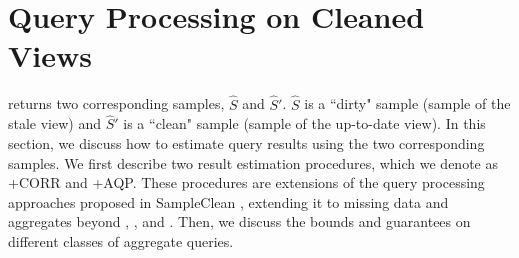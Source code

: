 \section{Query Processing on Cleaned Views}
\label{correction}
\svc returns two corresponding samples, $\widehat{S}$ and $\widehat{S}'$.
$\widehat{S}$ is a ``dirty" sample (sample of the stale view) and $\widehat{S}'$ is a ``clean" sample (sample of the up-to-date view).
In this section, we discuss how to estimate query results using the two corresponding samples. 
We first describe two result estimation procedures, which we denote as \svcnospace+CORR and \svcnospace+AQP. 
These procedures are extensions of the query processing approaches proposed in SampleClean \cite{wang1999sample}, extending it to missing data and aggregates beyond \sumfunc, \countfunc, and \avgfunc.
Then, we discuss the bounds and guarantees on different classes of aggregate queries.





